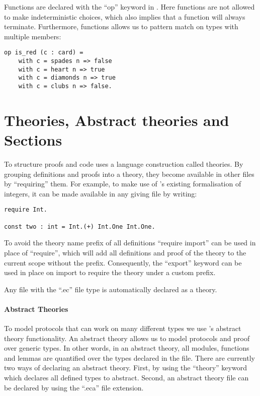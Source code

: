 \noindent
Functions are declared with the ``op'' keyword in \easycrypt.
Here functions are not allowed to make indeterministic choices, which also
implies that a function will always terminate.
Furthermore, functions allows us to pattern match on types with
multiple members:
\begin{lstlisting}
op is_red (c : card) =
    with c = spades n => false
    with c = heart n => true
    with c = diamonds n => true
    with c = clubs n => false.
\end{lstlisting}


\section{Theories, Abstract theories and Sections}
\label{sec:ec_theories}
To structure proofs and code \easycrypt uses a language construction called
theories. By grouping definitions and proofs into a theory, they become available
in other files by ``requiring'' them. For example, to make use of \easycrypt's
existing formalisation of integers, it can be made available in any giving file
by writing:

\begin{lstlisting}[float,label=lst:theory_require,caption=\easycrypt\ theories: importing definitions]
require Int.

const two : int = Int.(+) Int.One Int.One.
\end{lstlisting}

To avoid the theory name prefix of all definitions ``require import'' can be
used in place of ``require'', which will add all definitions and proof of the
theory to the current scope without the prefix. Consequently, the ``export''
keyword can be used in place on import to require the theory under a custom prefix.

Any \easycrypt file with the ``.ec'' file type is automatically declared as a
theory.

\paragraph{Abstract Theories}
To model protocols that can work on many different
types we use \easycrypt's abstract theory functionality. An abstract theory allows us to model
protocols and proof over generic types. In other words, in an abstract theory,
all modules, functions and lemmas are quantified over the types declared in the file.
There are currently two ways of declaring an abstract theory. First, by using the
``theory'' keyword which declares all defined types to abstract.
Second, an abstract theory file can be declared by using the ``.eca'' file extension.

